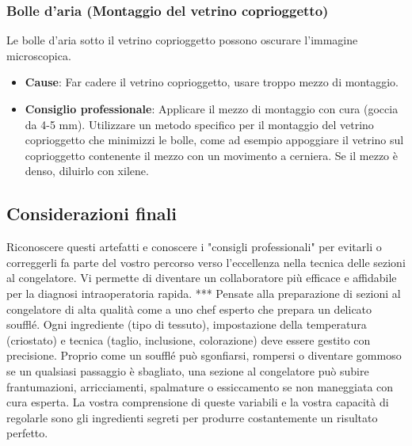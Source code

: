 \subsubsection{Bolle d'aria (Montaggio del vetrino coprioggetto)}
Le bolle d'aria sotto il vetrino coprioggetto possono oscurare l'immagine microscopica. 
\begin{itemize}
    \item   \textbf{Cause}: Far cadere il vetrino coprioggetto, usare troppo mezzo di montaggio. 
    \item   \textbf{Consiglio professionale}: Applicare il mezzo di montaggio con cura (goccia da 4-5 mm).  Utilizzare un metodo specifico per il montaggio del vetrino coprioggetto che minimizzi le bolle, come ad esempio appoggiare il vetrino sul coprioggetto contenente il mezzo con un movimento a cerniera.  Se il mezzo è denso, diluirlo con xilene.
\end{itemize}

\subsection{Considerazioni finali}
Riconoscere questi artefatti e conoscere i "consigli professionali" per evitarli o correggerli fa parte del vostro percorso verso l'eccellenza nella tecnica delle sezioni al congelatore.  Vi permette di diventare un collaboratore più efficace e affidabile per la diagnosi intraoperatoria rapida. 
***
Pensate alla preparazione di sezioni al congelatore di alta qualità come a uno chef esperto che prepara un delicato soufflé.  Ogni ingrediente (tipo di tessuto), impostazione della temperatura (criostato) e tecnica (taglio, inclusione, colorazione) deve essere gestito con precisione.  Proprio come un soufflé può sgonfiarsi, rompersi o diventare gommoso se un qualsiasi passaggio è sbagliato, una sezione al congelatore può subire frantumazioni, arricciamenti, spalmature o essiccamento se non maneggiata con cura esperta.  La vostra comprensione di queste variabili e la vostra capacità di regolarle sono gli ingredienti segreti per produrre costantemente un risultato perfetto.
